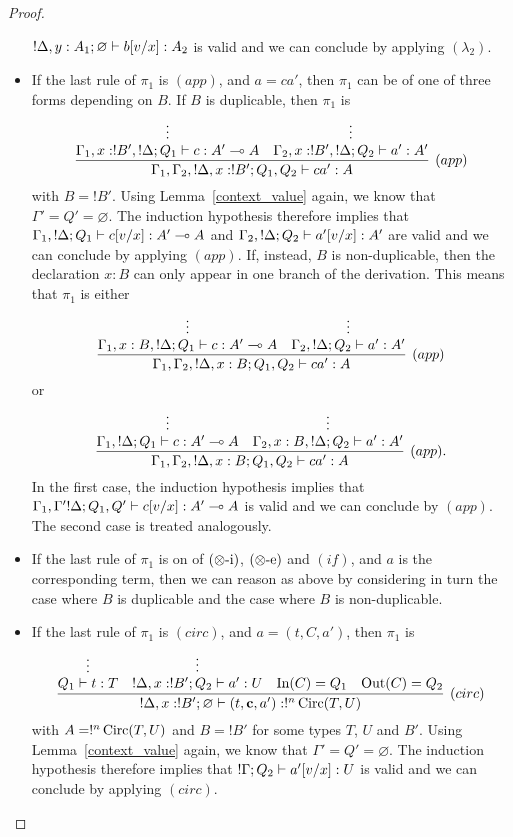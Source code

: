 \documentclass[twoside]{article}
\begin{document}
\begin{proof}
\begin{itemize}
 $!\Delta,y:A_1;\varnothing \vdash b[v/x]:A_2$ is valid and we can conclude
 by applying $(\lambda_2)$.
 \item If the last rule of $\pi_1$ is $(app)$, and $a=ca'$, then $\pi_1$ can 
 be of one of three forms depending on $B$. If $B$ is duplicable, then $\pi_1$ is
 \[
 \infer[(app)]{\Gamma_1,\Gamma_2,!\Delta,x:!B';Q_1,Q_2\entails ca':A}{
    \deduce[]{\Gamma_1, x:!B',!\Delta;Q_1\entails c:A'\loli A}{
      \vdots
    }
    &
    \deduce[]{\Gamma_2, x:!B',!\Delta ;Q_2\entails a':A' }{
      \vdots
    }
 }
 \]
 with $B=!B'$. Using 
 Lemma~\hyperref[context_value]{\ref*{context_value}} again, we 
 know that $\Gamma'=Q'=\varnothing$. The induction hypothesis therefore 
 implies that $\Gamma_1,!\Delta;Q_1\vdash c[v/x]:A'\multimap A$ and 
 $\Gamma_2,!\Delta ;Q_2\vdash a'[v/x]:A'$ are valid and we can conclude 
 by applying $(app)$. If, instead, $B$ is non-duplicable, then the declaration 
 $x:B$ can only appear in one branch of the derivation. This means that $\pi_1$ 
 is either 
  \[
 \infer[(app)]{\Gamma_1,\Gamma_2,!\Delta,x:B;Q_1,Q_2\entails ca':A}{
    \deduce[]{\Gamma_1, x:B,!\Delta;Q_1\entails c:A'\loli A}{
      \vdots
    }
    &
    \deduce[]{\Gamma_2, !\Delta ;Q_2\entails a':A'}{
      \vdots
    }     
 }
 \]
 or
  \[
 \infer[(app).]{\Gamma_1,\Gamma_2,!\Delta,x:B;Q_1,Q_2\entails ca':A}{
    \deduce[]{\Gamma_1, !\Delta;Q_1\entails c:A'\loli A}{ 
      \vdots
    }
    &
    \deduce[]{\Gamma_2, x:B,!\Delta ;Q_2\entails a':A'}{
      \vdots
    }     
 }
 \]
 In the first case, the induction hypothesis implies that 
 $\Gamma_1,\Gamma' !\Delta;Q_1,Q'\vdash c[v/x]:A'\multimap A$ is valid and 
 we can conclude by $(app)$. The second case is treated analogously.
 \item If the last rule of $\pi_1$ is on of $(\otimes\mbox{-i})$, $(\otimes\mbox{-e})$ 
 and $(if)$, and $a$ is the corresponding term, then we can reason as above
 by considering in turn the case where $B$ is duplicable and the case where
 $B$ is non-duplicable.
 \item If the last rule of $\pi_1$ is $(circ)$, and $a=(t,C,a')$, then 
 $\pi_1$ is
 \[
 \infer[(circ)]{!\Delta,x:!B';\varnothing \entails (t,\mathbf{c},a'):!^n\Circ(T,U)}{
    \deduce[]{Q_1\entails t:T}{
      \vdots
    }    
    &
    \deduce[]{!\Delta,x:!B' ; Q_2\entails a':U}{
      \vdots
    }     
    &
    \In(C)=Q_1 
    &
    \Out(C)=Q_2
 }
 \]
 with $A=!^n\mathop{\textrm{Circ}}\nolimits(T,U)$ and $B=!B'$ for some types $T$, $U$ and $B'$. Using  
 Lemma~\hyperref[context_value]{\ref*{context_value}} again, we know 
 that $\Gamma'=Q'=\varnothing$. The induction hypothesis therefore implies that
 $!\Gamma; Q_2\vdash a'[v/x]:U$ is valid and we can conclude
 by applying $(circ)$.
\end{itemize}
\end{proof}
\end{document}
